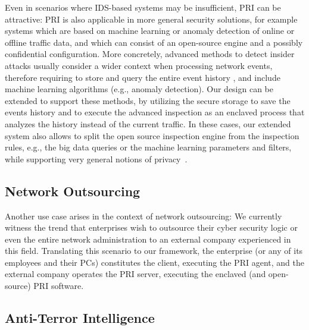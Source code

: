 \documentclass{sig-alternate-10pt}
\newcommand{\sys}{PRI\xspace}
\begin{document}
 Even in scenarios where IDS-based systems may be insufficient,
 \sys can be attractive: \sys is also applicable in more general
 security solutions, for example systems which are based on machine learning
 or anomaly detection of online or offline traffic data, and 
 which can consist of an open-source engine and a possibly confidential
 configuration.
More concretely, advanced methods to detect insider attacks usually consider 
 a wider context when processing network events, therefore requiring to 
 store and query the entire event history \cite{splunk-insider}, 
 and include machine learning algorithms \cite{proactive-insider} (e.g., anomaly detection). 
 Our design can be extended to support these methods, 
 by utilizing the secure storage to save the events history and to
 execute the 
 advanced inspection as an enclaved process that analyzes 
 the history instead of the current traffic. 
 In these cases, our extended system also allows to split the open source 
 inspection engine from the inspection rules, e.g., the big data queries or the machine learning parameters and filters, while
 supporting very general notions of privacy~\cite{privacy2,privacy3,privacy1}. 
 
\subsection{Network Outsourcing}

Another use case arises in the context of network 
outsourcing: We currently witness the trend that 
enterprises wish to outsource their 
cyber security logic or even the entire network administration 
to an external company experienced in this field. 
Translating this scenario to our framework, the enterprise 
(or any of its employees and their PCs) 
constitutes the client, executing the \sys agent, 
and the external 
company operates the \sys server, 
executing the enclaved (and open-source) \sys software. 


\subsection{Anti-Terror Intelligence}
\end{document}
